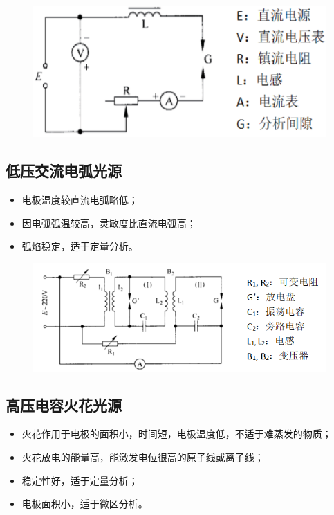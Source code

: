 \begin{figure}[!h]
	\centering
	\includegraphics[width=0.6\linewidth]{image/chp8_circuit_diagram1.eps}
	\label{fig:chp8circuitdiagram1}
\end{figure}


\subsection{低压交流电弧光源}

\begin{itemize}
	\item 电极温度较直流电弧略低；
	\item 因电弧弧温较高，灵敏度比直流电弧高；
	\item 弧焰稳定，适于定量分析。
\end{itemize}

\begin{figure}[!h]
	\centering
	\includegraphics[width=0.7\linewidth]{image/chp8_circuit_diagram2}
	\label{fig:chp8circuitdiagram2}
\end{figure}

\subsection{高压电容火花光源}
\begin{itemize}
	\item 火花作用于电极的面积小，时间短，电极温度低，不适于难蒸发的物质；
	\item 火花放电的能量高，能激发电位很高的原子线或离子线；
	\item 稳定性好，适于定量分析；
	\item 电极面积小，适于微区分析。
\end{itemize}

